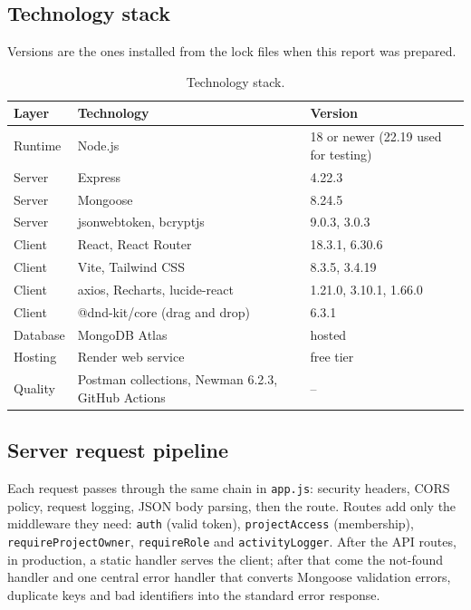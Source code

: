 \documentclass[11pt,a4paper]{article}
\newcommand{\code}[1]{\texttt{#1}}
\begin{document}
\subsection{Technology stack}
Versions are the ones installed from the lock files when this report was prepared.
\begin{table}[H]
\centering\small
\begin{tabular}{@{}lll@{}}
\toprule
\textbf{Layer} & \textbf{Technology} & \textbf{Version}\\
\midrule
Runtime & Node.js & 18 or newer (22.19 used for testing)\\
Server & Express & 4.22.3\\
Server & Mongoose & 8.24.5\\
Server & jsonwebtoken, bcryptjs & 9.0.3, 3.0.3\\
Client & React, React Router & 18.3.1, 6.30.6\\
Client & Vite, Tailwind CSS & 8.3.5, 3.4.19\\
Client & axios, Recharts, lucide-react & 1.21.0, 3.10.1, 1.66.0\\
Client & @dnd-kit/core (drag and drop) & 6.3.1\\
Database & MongoDB Atlas & hosted\\
Hosting & Render web service & free tier\\
Quality & Postman collections, Newman 6.2.3, GitHub Actions & --\\
\bottomrule
\end{tabular}
\caption{Technology stack.}
\end{table}

\subsection{Server request pipeline}
Each request passes through the same chain in \code{app.js}: security headers, CORS policy, request logging, JSON body parsing, then the route. Routes add only the middleware they need: \code{auth} (valid token), \code{projectAccess} (membership), \code{requireProjectOwner}, \code{requireRole} and \code{activityLogger}. After the API routes, in production, a static handler serves the client; after that come the not-found handler and one central error handler that converts Mongoose validation errors, duplicate keys and bad identifiers into the standard error response.
\end{document}
